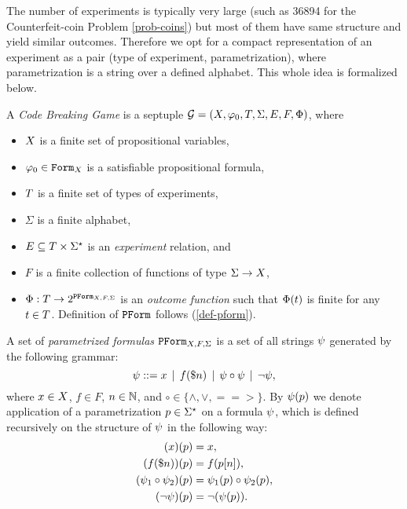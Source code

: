The number of experiments is typically very large
  (such as 36894 for the Counterfeit-coin Problem \ref{prob-coins})
  but most of them have same structure and yield similar outcomes.
Therefore we opt for a compact representation of an experiment as a pair
  (type of experiment, parametrization), where parametrization is a string
  over a defined alphabet.
This whole idea is formalized below.

\begin{definition} \label{def:game}
A \emph{Code Breaking Game} is a septuple
  $\mathcal{G} = (X, \varphi_0, T, \Sigma, E, F, \Phi)$, where
  \begin{itemize}
  \item $X$ is a finite set of propositional variables,
  \item $\varphi_0 \in \mathtt{Form}_X$ is a satisfiable propositional formula,
  \item $T$ is a finite set of types of experiments,
  \item $\Sigma$ is a finite alphabet,
  \item $E \subseteq T \times \Sigma^\star$
    is an \emph{experiment} relation, and
  \item $F$ is a finite collection of functions of type $\Sigma -> X$,
  \item $\Phi: T -> 2^{\mathtt{PForm}_{X,F,\Sigma}}$ is an
  \emph{outcome function} such that $\Phi(t)$ is finite
  for any $t\in T$. Definition of $\mathtt{PForm}$ follows
   (\autoref{def-pform}).
  \end{itemize}
\end{definition}

\begin{definition} \label{def-pform}
A set of \emph{parametrized formulas} $\mathtt{PForm}_{X,F,\Sigma}$ is a set of
  all strings $\psi$ generated by the following grammar:
  $$ \psi ::= x \:\:|\:\: f(\$n) \:\:|\:\: \psi \circ \psi \:\:|\:\: \neg \psi,$$
  where $x\in X$, $f\in F$, $n \in\mathbb{N}$,
  and $\circ\in\{\wedge, \vee, ==>\}$.
By $\psi(p)$ we denote application of
  a parametrization $p\in\Sigma^\star$
  on a formula $\psi$,
  which is defined recursively on the structure of $\psi$
  in the following way:
\begin{align}
(x)(p) &= x, \\
(f(\$n))(p) &= f(p[n]),\\
(\psi_1\circ\psi_2)(p) &= \psi_1(p) \circ \psi_2(p),\\
(\neg\psi)(p) &= \neg(\psi(p)).
\end{align}
\end{definition}

